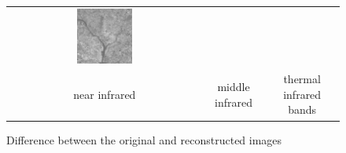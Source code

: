 \documentclass[11pt,a4paper]{article}
\begin{document}
\begin{figure}[!htbp]
\begin{tabular}{ccc}
		\includegraphics[width=0.3\textwidth]{pro10/PC/11_42_f}\\
		near infrared & middle infrared& thermal infrared bands
	\end{tabular}
	\caption{Difference between the original and reconstructed images}
	\label{pro10_fig5}
\end{figure}

\clearpage


\end{document}
